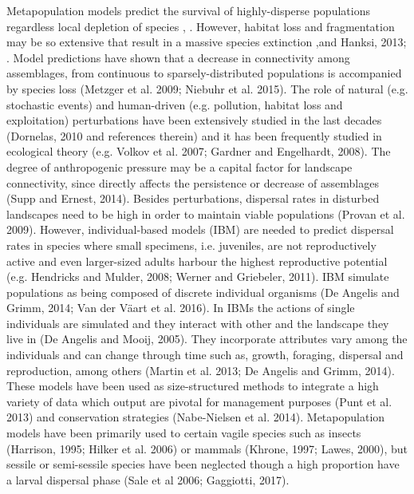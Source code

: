 \documentclass[12pt]{article}
\begin{document}
\begin{flushleft}
{{{{{Metapopulation models predict the survival of highly-disperse populations regardless local depletion of species \cite{hanski1999habitat}, \cite{akccakaya2007role}. However, habitat loss and fragmentation may be so extensive that result in a massive species extinction \cite{montoya2008habitat},\citeRybicki and Hanksi, 2013; \cite{haddad2015habitat}. Model predictions have shown that a decrease in connectivity among assemblages, from continuous to sparsely-distributed populations is accompanied by species loss (Metzger et al. 2009; Niebuhr et al. 2015). The role of natural (e.g. stochastic events) and human-driven (e.g. pollution, habitat loss and exploitation) perturbations have been extensively studied in the last decades (Dornelas, 2010 and references therein) and it has been frequently studied in ecological theory (e.g. Volkov et al. 2007; Gardner and Engelhardt, 2008). The degree of anthropogenic pressure may be a capital factor for landscape connectivity, since directly affects the persistence or decrease of assemblages (Supp and Ernest, 2014). Besides perturbations, dispersal rates in disturbed landscapes need to be high in order to maintain viable populations (Provan et al. 2009). However, individual-based models (IBM) are needed to predict dispersal rates in species where small specimens, i.e. juveniles, are not reproductively active and even larger-sized adults harbour the highest reproductive potential (e.g. Hendricks and Mulder, 2008; Werner and Griebeler, 2011). 
IBM simulate populations as being composed of discrete individual organisms (De Angelis and Grimm, 2014; Van der Väart et al. 2016). In IBMs the actions of single individuals are simulated and they interact with other and the landscape they live in (De Angelis and Mooij, 2005). They incorporate attributes vary among the individuals and can change through time such as, growth, foraging, dispersal and reproduction, among others (Martin et al. 2013; De Angelis and Grimm, 2014). These models have been used as size-structured methods to integrate a high variety of data which output are pivotal for management purposes (Punt et al. 2013) and conservation strategies (Nabe-Nielsen et al. 2014). Metapopulation models have been primarily used to certain vagile species such as insects (Harrison, 1995; Hilker et al. 2006) or mammals (Khrone, 1997; Lawes, 2000), but sessile or semi-sessile species have been neglected though a high proportion have a larval dispersal phase (Sale et al 2006; Gaggiotti, 2017).



}}}}}
\end{flushleft}
\end{document}
